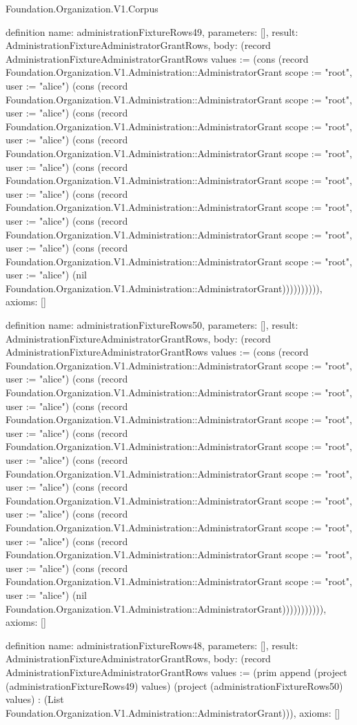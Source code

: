 \begin{lexlean}{Foundation.Organization.V1.Corpus}
\begin{semanticmodule}
definition{
  name: administrationFixtureRows49,
  parameters: [],
  result: AdministrationFixtureAdministratorGrantRows,
  body: (record AdministrationFixtureAdministratorGrantRows {values := (cons (record Foundation.Organization.V1.Administration::AdministratorGrant {scope := "root", user := "alice"}) (cons (record Foundation.Organization.V1.Administration::AdministratorGrant {scope := "root", user := "alice"}) (cons (record Foundation.Organization.V1.Administration::AdministratorGrant {scope := "root", user := "alice"}) (cons (record Foundation.Organization.V1.Administration::AdministratorGrant {scope := "root", user := "alice"}) (cons (record Foundation.Organization.V1.Administration::AdministratorGrant {scope := "root", user := "alice"}) (cons (record Foundation.Organization.V1.Administration::AdministratorGrant {scope := "root", user := "alice"}) (cons (record Foundation.Organization.V1.Administration::AdministratorGrant {scope := "root", user := "alice"}) (cons (record Foundation.Organization.V1.Administration::AdministratorGrant {scope := "root", user := "alice"}) (nil Foundation.Organization.V1.Administration::AdministratorGrant)))))))))}),
  axioms: []
}

definition{
  name: administrationFixtureRows50,
  parameters: [],
  result: AdministrationFixtureAdministratorGrantRows,
  body: (record AdministrationFixtureAdministratorGrantRows {values := (cons (record Foundation.Organization.V1.Administration::AdministratorGrant {scope := "root", user := "alice"}) (cons (record Foundation.Organization.V1.Administration::AdministratorGrant {scope := "root", user := "alice"}) (cons (record Foundation.Organization.V1.Administration::AdministratorGrant {scope := "root", user := "alice"}) (cons (record Foundation.Organization.V1.Administration::AdministratorGrant {scope := "root", user := "alice"}) (cons (record Foundation.Organization.V1.Administration::AdministratorGrant {scope := "root", user := "alice"}) (cons (record Foundation.Organization.V1.Administration::AdministratorGrant {scope := "root", user := "alice"}) (cons (record Foundation.Organization.V1.Administration::AdministratorGrant {scope := "root", user := "alice"}) (cons (record Foundation.Organization.V1.Administration::AdministratorGrant {scope := "root", user := "alice"}) (cons (record Foundation.Organization.V1.Administration::AdministratorGrant {scope := "root", user := "alice"}) (nil Foundation.Organization.V1.Administration::AdministratorGrant))))))))))}),
  axioms: []
}

definition{
  name: administrationFixtureRows48,
  parameters: [],
  result: AdministrationFixtureAdministratorGrantRows,
  body: (record AdministrationFixtureAdministratorGrantRows {values := (prim append (project (administrationFixtureRows49) values) (project (administrationFixtureRows50) values) : (List Foundation.Organization.V1.Administration::AdministratorGrant))}),
  axioms: []
}


\end{semanticmodule}
\end{lexlean}
